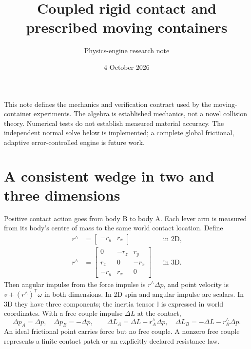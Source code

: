 \documentclass[11pt]{article}
\title{Coupled rigid contact and prescribed moving containers}
\author{Physics-engine research note}
\date{4 October 2026}
\begin{document}
\maketitle
\noindent This note defines the mechanics and verification contract used by the
moving-container experiments. The algebra is established mechanics, not a
novel collision theory. Numerical tests do not establish measured material
accuracy. The independent normal solve below is implemented; a complete global
frictional, adaptive error-controlled engine is future work.

\section{A consistent wedge in two and three dimensions}
Positive contact action goes from body B to body A. Each lever arm is measured
from its body's centre of mass to the same world contact location. Define
\begin{align}
 r^{\wedge} &= \begin{bmatrix}-r_y&r_x\end{bmatrix}
       &&\text{in 2D},\\
 r^{\wedge} &= \begin{bmatrix}0&-r_z&r_y\\r_z&0&-r_x\\-r_y&r_x&0\end{bmatrix}
       &&\text{in 3D}.
\end{align}
Then angular impulse from the force impulse is $r^{\wedge}\Delta p$,
and point velocity is $v+(r^{\wedge})^{\mathsf T}\omega$ in both dimensions.
In 2D spin and angular impulse are scalars. In 3D they have three components;
the inertia tensor $\mathbb I$ is expressed in world coordinates.
With a free couple impulse $\Delta L$ at the contact,
\begin{equation}
 \Delta p_A=\Delta p,\quad \Delta p_B=-\Delta p,\qquad
 \Delta L_A=\Delta L+r_A^{\wedge}\Delta p,\quad
 \Delta L_B=-\Delta L-r_B^{\wedge}\Delta p.
\end{equation}
An ideal frictional point carries force but no free couple. A nonzero free
couple represents a finite contact patch or an explicitly declared resistance law.
\end{document}
